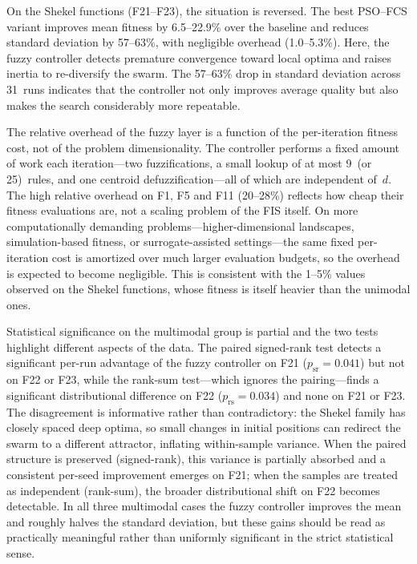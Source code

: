 \documentclass[conference]{IEEEtran}
\newcommand{\new}[1]{{\color{red}#1}}
\begin{document}
On the Shekel functions (F21--F23), the situation is reversed. The best PSO--FCS variant improves mean fitness by 6.5--22.9\% over the baseline and reduces standard deviation by 57--63\%, with negligible overhead (1.0--5.3\%). Here, the fuzzy controller detects premature convergence toward local optima and raises inertia to re-diversify the swarm. The 57--63\% drop in standard deviation across 31~runs indicates that the controller not only improves average quality but also makes the search considerably more repeatable.

\new{The relative overhead of the fuzzy layer is a function of the per-iteration fitness cost, not of the problem dimensionality. The controller performs a fixed amount of work each iteration---two fuzzifications, a small lookup of at most 9~(or 25)~rules, and one centroid defuzzification---all of which are independent of~$d$. The high relative overhead on F1, F5 and F11 (20--28\%) reflects how cheap their fitness evaluations are, not a scaling problem of the FIS itself. On more computationally demanding problems---higher-dimensional landscapes, simulation-based fitness, or surrogate-assisted settings---the same fixed per-iteration cost is amortized over much larger evaluation budgets, so the overhead is expected to become negligible. This is consistent with the 1--5\% values observed on the Shekel functions, whose fitness is itself heavier than the unimodal ones.}

\new{Statistical significance on the multimodal group is partial and the two tests highlight different aspects of the data. The paired signed-rank test detects a significant per-run advantage of the fuzzy controller on F21 ($p_{\text{sr}} = 0.041$) but not on F22 or F23, while the rank-sum test---which ignores the pairing---finds a significant distributional difference on F22 ($p_{\text{rs}} = 0.034$) and none on F21 or F23. The disagreement is informative rather than contradictory: the Shekel family has closely spaced deep optima, so small changes in initial positions can redirect the swarm to a different attractor, inflating within-sample variance. When the paired structure is preserved (signed-rank), this variance is partially absorbed and a consistent per-seed improvement emerges on F21; when the samples are treated as independent (rank-sum), the broader distributional shift on F22 becomes detectable. In all three multimodal cases the fuzzy controller improves the mean and roughly halves the standard deviation, but these gains should be read as practically meaningful rather than uniformly significant in the strict statistical sense.}
\end{document}
